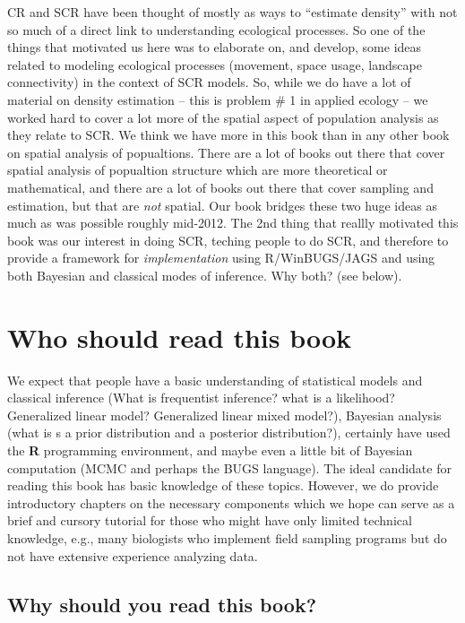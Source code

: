 CR and SCR have been thought of mostly as ways to ``estimate density''
with not so much of a direct link to understanding ecological
processes. So one of the things that motivated us here was to
elaborate on, and develop, some ideas related to modeling ecological
processes (movement, space usage, landscape connectivity) in the
context of SCR models.  So, while we do have a lot of material on
density estimation -- this is problem \# 1 in applied ecology -- we
worked hard to cover a lot more of the spatial aspect of population
analysis as they relate to SCR. We think we have more in this book
than in any other book on spatial analysis of popualtions. There are a
lot of books out there that cover spatial analysis of popualtion
structure which are more theoretical or mathematical, and there are a
lot of books out there that cover sampling and estimation, but that
are {\it not} spatial. Our book bridges these two huge ideas as much
as was possible roughly mid-2012.  The 2nd thing that reallly
motivated this book was our interest in doing SCR, teching people to
do SCR, and therefore to provide a framework for {\it implementation}
using R/WinBUGS/JAGS and using both Bayesian and classical modes of
inference.  Why both?  (see below).

\section*{Who should read this book}

We expect that people have a basic understanding of statistical models
and classical inference (What is frequentist inference? what is a
likelihood? Generalized linear model? Generalized linear mixed
model?), Bayesian analysis (what is s a prior distribution and a
posterior distribution?), certainly have used the {\bf R} programming
environment, and maybe even a little bit of Bayesian computation (MCMC
and perhaps the BUGS language).  The ideal candidate for reading this
book has basic knowledge of these topics. However, we do provide
introductory chapters on the necessary components which we hope can
serve as a brief and cursory tutorial for those who might have only
limited technical knowledge, e.g., many biologists who implement field
sampling programs but do not have extensive experience analyzing data.


\subsection*{Why should you read this book?}

